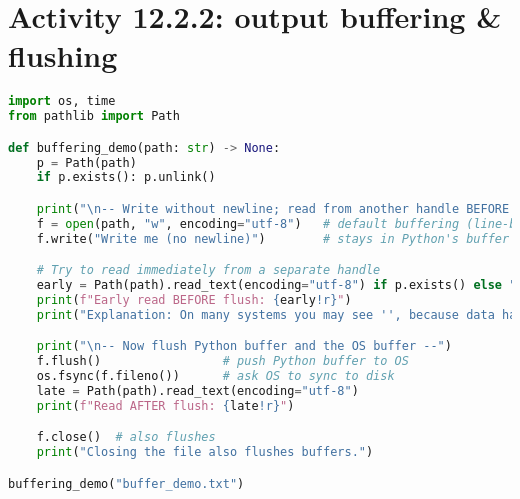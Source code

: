 \section{Activity 12.2.2: output buffering \& flushing}
\begin{lstlisting}[language=Python, caption={Show that buffers may delay writes; then force flush to disk.}]
import os, time
from pathlib import Path

def buffering_demo(path: str) -> None:
    p = Path(path)
    if p.exists(): p.unlink()

    print("\n-- Write without newline; read from another handle BEFORE flush --")
    f = open(path, "w", encoding="utf-8")   # default buffering (line-buffered)
    f.write("Write me (no newline)")        # stays in Python's buffer so far

    # Try to read immediately from a separate handle
    early = Path(path).read_text(encoding="utf-8") if p.exists() else "<missing>"
    print(f"Early read BEFORE flush: {early!r}")
    print("Explanation: On many systems you may see '', because data hasn't been flushed.")

    print("\n-- Now flush Python buffer and the OS buffer --")
    f.flush()                 # push Python buffer to OS
    os.fsync(f.fileno())      # ask OS to sync to disk
    late = Path(path).read_text(encoding="utf-8")
    print(f"Read AFTER flush: {late!r}")

    f.close()  # also flushes
    print("Closing the file also flushes buffers.")

buffering_demo("buffer_demo.txt")
\end{lstlisting}

